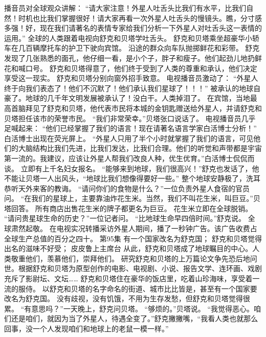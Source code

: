\documentclass[a4paper,12pt,UTF8,twoside]{ctexbook}
\begin{document}
        播音员对全球观众讲解：  “请大家注意！外星人吐舌头比我们有水平，比我们自然！时机也比我们掌握很好！请大家再看一次外星人吐舌头的慢镜头。瞧，分寸感多强！好，现在我们请著名的表情专家给我们分析一下外星人对吐舌头这一表情的运用。” 
        全球的人类跟着电视向舒克和贝塔学吐舌头。 
        舒克和贝塔乘坐超豪华小轿车在几百辆摩托车的护卫下驶向宾馆。 
        沿途的群众向车队抛掷鲜花和彩带。 
        舒克发现了几张熟悉的面孔，他仔细一看，是小个子，胖子和瘦子。他们起劲儿地扔鲜花和喊口号。 
        舒克和贝塔得意了，他们终于受到了人类的尊重和承认，他们决定享受这一现实。 
        舒克和贝塔分别向窗外招手致意。 
        电视播音员激动了： 
        “外星人终于向我们表态了！他们不沉默了！他们承认我们星球了！！！” 
        被承认的地球自豪了。地球的几千年文明发展被承认了！没白干。人类掉泪了。 
        在宾馆，当地最高首脑拜见了舒克和贝塔，他代表市民将本城的金钥匙赠送给外星人，并请舒克和贝塔担任该市的荣誉市民。 
        “我们非常荣幸。”贝塔张口说话了。 
        电视播音员几乎足喊起来： 
        “他们已经掌握了我们的语言！现在请著名语言学家白活博士分析！” 
        白活博士出现在荧光屏上。 
        “外星人只用了半个小时就掌握了我们的语言，可见他们的大脑结构比我们先进，比我们发达，比我们合理。他们的听觉和声带都是宇宙第一流的。我建议，应该让外星人帮我们改良人种，优生优育。”白活博士侃侃而谈。 
        立即有上千名妇女报名。 
        “能够来到地球，我们很高兴！”舒克也发话了，他不能让贝塔一人出风头，“地球比我们想像得要好一些。” 
        整个地球安静极了，洗耳恭听天外来客的教诲。 
        “请问你们的食物是什么？”一位负责外星人食宿的官员问。 
        “在我们的星球上，主要靠油炸花生米。当然，我们不叫花生米，叫巨豆。”贝塔回答。 
        所有商店出售花生米的牌子都更名为巨豆。 
        花生米立即在全球脱销。 
        “请问贵星球生命的历史？”一位记者问。 
        “比地球生命早四倍时间。”舒克说。 
        全球肃然起敬。 
        在电视实况转播采访外星人期间，播了一秒钟广告。该广告收费占全球生产总值的百分之四十。   第95集 
        有一个国家改名为舒克国； 
        舒克和贝塔觉得出名的滋味不好受； 
        皮皮鲁上主席台   
        从此，舒克和贝塔成了地球瞩目的中心。人类敬重他们，羡慕他们，崇拜他们。 
        研究舒克和贝塔的上万篇论文争先恐后地问世。根据舒克和贝塔为原型创作的电影、电视剧、小说、报告文学、连环画、戏剧充斥了影尉坛、文坛…… 
        舒克和贝塔住在豪华的饭店里，吃着山珍海味，享受着一流的服侍。 
        以舒克和贝塔的名字命名的街道、城市比比皆是，甚至有一个国家要改名为舒克国。 
        没有歧视，没有饥饿，不用为生存发愁，但舒克和贝塔觉得很累。 
        “有意思吗？”一天晚上，舒克问贝塔。 
        “够烦的。”贝塔说。 
        “我觉得恶心。咱们还是咱们，就因为当了外星人，待遇全变了。”舒克撇撇嘴，“我看人类也就那么回事，没一个人发现咱们和地球上的老鼠一模一样。” 
\end{document}

